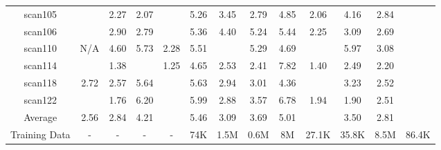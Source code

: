 \begin{table}[t]
\begin{tabular}{ccccccccccccc}
scan105 & \cellcolor{yellow}{2.05} & 2.27 & 2.07 & \cellcolor{orange}{1.10} & 5.26 & 3.45 & 2.79 & 4.85 & 2.06 & 4.16 & 2.84 & \cellcolor{red}{1.07} \\
scan106 & \cellcolor{yellow}{2.01} & 2.90 & 2.79 & \cellcolor{orange}{1.46} & 5.36 & 4.40 & 5.24 & 5.44 & 2.25 & 3.09 & 2.69 & \cellcolor{red}{1.26} \\
scan110 & N/A & 4.60 & 5.73 & 2.28 & 5.51 & \cellcolor{yellow}{1.97} & 5.29 & 4.69 & \cellcolor{orange}{1.92} & 5.97 & 3.08 & \cellcolor{red}{0.95} \\
scan114 & \cellcolor{orange}{1.10} & 1.38 & \cellcolor{yellow}{1.20} & 1.25 & 4.65 & 2.53 & 2.41 & 7.82 & 1.40 & 2.49 & 2.20 & \cellcolor{red}{0.82} \\
scan118 & 2.72 & 2.57 & 5.64 & \cellcolor{orange}{1.44} & 5.63 & 2.94 & 3.01 & 4.36 & \cellcolor{yellow}{2.43} & 3.23 & 2.52 & \cellcolor{red}{1.18} \\
scan122 & \cellcolor{yellow}{1.64} & 1.76 & 6.20 & \cellcolor{orange}{1.45} & 5.99 & 2.88 & 3.57 & 6.78 & 1.94 & 1.90 & 2.51 & \cellcolor{red}{1.07} \\
\midrule
Average & 2.56 & 2.84 & 4.21 & \cellcolor{orange}{1.86} & 5.46 & 3.09 & 3.69 & 5.01 & \cellcolor{yellow}{2.38} & 3.50 & 2.81 & \cellcolor{red}{1.42} \\
\midrule
\small{Training Data} & - & - & - & - & 74K & 1.5M & 0.6M & 8M & 27.1K & 35.8K & 8.5M & 86.4K \\
\bottomrule
\end{tabular}
\vspace{-9pt}
\label{tab:dtu-all}
\end{table}

